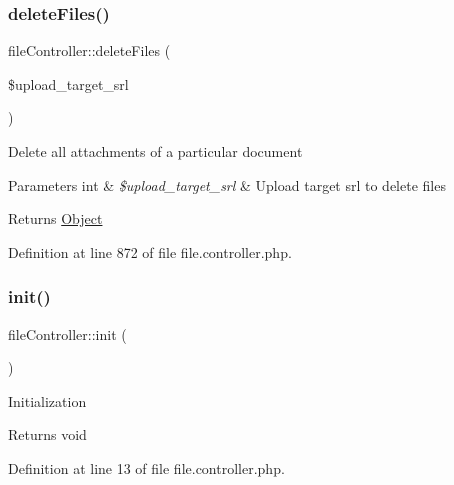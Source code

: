 \hypertarget{classfileController_ae3060e078930eeaae0c939d7a1c4f229}{}\label{classfileController_ae3060e078930eeaae0c939d7a1c4f229} 
\subsubsection{\texorpdfstring{delete\+Files()}{deleteFiles()}}
{\footnotesize\ttfamily file\+Controller\+::delete\+Files (\begin{DoxyParamCaption}\item[{}]{\$upload\+\_\+target\+\_\+srl }\end{DoxyParamCaption})}

Delete all attachments of a particular document


\begin{DoxyParams}[1]{Parameters}
int & {\em \$upload\+\_\+target\+\_\+srl} & Upload target srl to delete files \\
\hline
\end{DoxyParams}
\begin{DoxyReturn}{Returns}
\hyperlink{classObject}{Object} 
\end{DoxyReturn}


Definition at line 872 of file file.\+controller.\+php.

\hypertarget{classfileController_aea1086732740ff005a00f7152e30937d}{}\label{classfileController_aea1086732740ff005a00f7152e30937d} 
\subsubsection{\texorpdfstring{init()}{init()}}
{\footnotesize\ttfamily file\+Controller\+::init (\begin{DoxyParamCaption}{ }\end{DoxyParamCaption})}

Initialization \begin{DoxyReturn}{Returns}
void 
\end{DoxyReturn}


Definition at line 13 of file file.\+controller.\+php.

\hypertarget{classfileController_aa9247b382342e097dcd71dac7b944c50}{}\label{classfileController_aa9247b382342e097dcd71dac7b944c50} 

